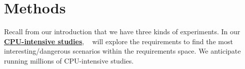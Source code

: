 
 








 





\section{Methods }\label{rqs}
Recall from our introduction that we have three kinds of  experiments.   In our
\underline{\bf CPU-intensive studies},
\IT~ will explore the requirements to find the most interesting/dangerous scenarios within the requirements space. We anticipate running millions of   CPU-intensive studies.

